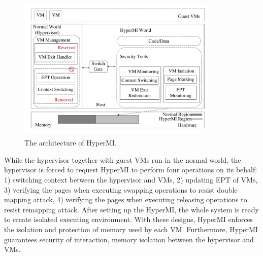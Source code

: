 \documentclass[conference]{IEEEtran}
\begin{document}
\begin{figure}
\centerline{\includegraphics[width=9.5cm, height=7cm]{pdfvmcs1.pdf}}%
\caption{The architecture of HyperMI. } \label{fig1}
\end{figure}

While the hypervisor together with guest VMs run in the normal world, the hypervisor is forced to request HyperMI to perform four operations on its behalf: 1) switching context between the hypervisor and VMs, 2) updating EPT of VMs, 3) verifying the pages when executing swapping operations to resist double mapping attack, 4) verifying the pages when executing releasing operations to resist remapping attack. After setting up the HyperMI, the whole system is ready to create isolated executing environment. With these designs, HyperMI enforces the isolation and protection of memory used by each VM. Furthermore, HyperMI guarantees security of interaction, memory isolation between the hypervisor and VMs.

\end{document}
